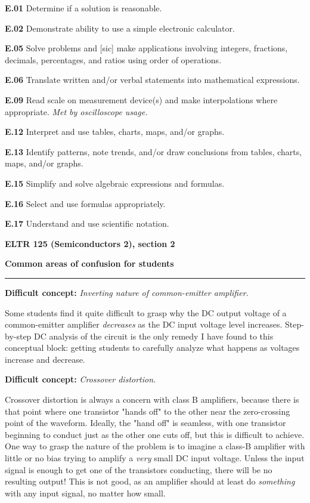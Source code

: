 \item{\bf E.01} Determine if a solution is reasonable.
\item{\bf E.02} Demonstrate ability to use a simple electronic calculator.
\item{\bf E.05} Solve problems and [sic] make applications involving integers, fractions, decimals, percentages, and ratios using order of operations.
\item{\bf E.06} Translate written and/or verbal statements into mathematical expressions.
\item{\bf E.09} Read scale on measurement device(s) and make interpolations where appropriate.  {\it Met by oscilloscope usage.}
\item{\bf E.12} Interpret and use tables, charts, maps, and/or graphs.
\item{\bf E.13} Identify patterns, note trends, and/or draw conclusions from tables, charts, maps, and/or graphs.
\item{\bf E.15} Simplify and solve algebraic expressions and formulas.
\item{\bf E.16} Select and use formulas appropriately.
\item{\bf E.17} Understand and use scientific notation.
\medskip




\vfil \eject

\centerline{\bf ELTR 125 (Semiconductors 2), section 2} \bigskip 
 
\vskip 10pt

\noindent
{\bf Common areas of confusion for students}

\vskip 5pt


\hrule \vskip 5pt

\vskip 10pt

\noindent
{\bf Difficult concept: } {\it Inverting nature of common-emitter amplifier.}

Some students find it quite difficult to grasp why the DC output voltage of a common-emitter amplifier {\it decreases} as the DC input voltage level increases.  Step-by-step DC analysis of the circuit is the only remedy I have found to this conceptual block: getting students to carefully analyze what happens as voltages increase and decrease.

\vskip 10pt

\noindent
{\bf Difficult concept: } {\it Crossover distortion.}

Crossover distortion is always a concern with class B amplifiers, because there is that point where one transistor "hands off" to the other near the zero-crossing point of the waveform.  Ideally, the "hand off" is seamless, with one transistor beginning to conduct just as the other one cuts off, but this is difficult to achieve.  One way to grasp the nature of the problem is to imagine a class-B amplifier with little or no bias trying to amplify a {\it very} small DC input voltage.  Unless the input signal is enough to get one of the transistors conducting, there will be no resulting output!  This is not good, as an amplifier should at least do {\it something} with any input signal, no matter how small.


